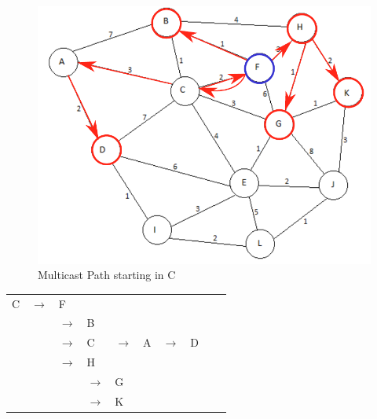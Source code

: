 \documentclass[a4paper, 11 pt, article, accentcolor=tud7b]{tudreport}
\begin{document}
	\begin{figure}[h]
	  \centering
    \includegraphics[width=\textwidth/2]{graph-b.pdf}
    \caption{Multicast Path starting in C}
  \end{figure}
	\begin{tabular}{llllllllll}
		C & $\rightarrow$ & F & & & & & & &\\
		& & $\rightarrow$ & B & & & & & & \\
		& & $\rightarrow$ & C & $\rightarrow$ & A & $\rightarrow$ & D & &\\
		& & $\rightarrow$ & H & & & & & & \\
		& & & $\rightarrow$ & G & & & & &\\
		& & & $\rightarrow$ & K & & & & &
	\end{tabular}
	
	
\end{document}
